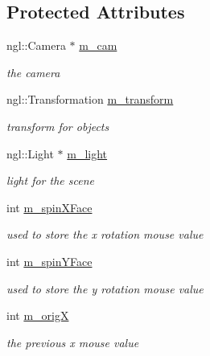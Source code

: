 \subsection*{Protected Attributes}
\begin{DoxyCompactItemize}
\item 
ngl::Camera $\ast$ \hyperlink{classGLWindow_a55556dafb4fc86c35b270ca0d68f456e}{m\_\-cam}
\begin{DoxyCompactList}\small\item\em the camera \item\end{DoxyCompactList}\item 
ngl::Transformation \hyperlink{classGLWindow_aea05160d13c53f0fee53e22c8c55368e}{m\_\-transform}
\begin{DoxyCompactList}\small\item\em transform for objects \item\end{DoxyCompactList}\item 
ngl::Light $\ast$ \hyperlink{classGLWindow_a45cb8c5f6e0004c2cce30eb1d5b3c56f}{m\_\-light}
\begin{DoxyCompactList}\small\item\em light for the scene \item\end{DoxyCompactList}\item 
int \hyperlink{classGLWindow_af8ea09020a5ad4c20a16ea835ed1f2af}{m\_\-spinXFace}
\begin{DoxyCompactList}\small\item\em used to store the x rotation mouse value \item\end{DoxyCompactList}\item 
int \hyperlink{classGLWindow_aa4c39badfa80d8eac6a773449b6db5a2}{m\_\-spinYFace}
\begin{DoxyCompactList}\small\item\em used to store the y rotation mouse value \item\end{DoxyCompactList}\item 
int \hyperlink{classGLWindow_ab6aec410f5ce5868cabe5fe2f0768bc9}{m\_\-origX}
\begin{DoxyCompactList}\small\item\em the previous x mouse value \item\end{DoxyCompactList}\item 

\end{DoxyCompactItemize}
